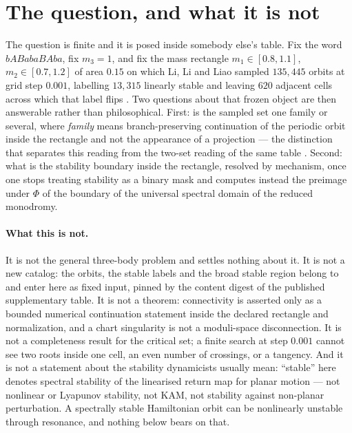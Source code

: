 \documentclass[11pt]{article}
\begin{document}
\section{The question, and what it is not}

The question is finite and it is posed inside somebody else's table. Fix the word $bABabaBAba$, fix
$m_3=1$, and fix the mass rectangle $m_1\in[0.8,1.1]$, $m_2\in[0.7,1.2]$ of area $0.15$ on which
Li, Li and Liao sampled $135{,}445$ orbits at grid step $0.001$, labelling $13{,}315$ linearly
stable and leaving $620$ adjacent cells across which that label flips \cite{li2021stable}. Two
questions about that frozen object are then answerable rather than philosophical. First: is the
sampled set one family or several, where \emph{family} means branch-preserving continuation of the
periodic orbit inside the rectangle and not the appearance of a projection --- the distinction that
separates this reading from the two-set reading of the same table \cite{stancevic2023moth}. Second:
what is the stability boundary inside the rectangle, resolved by mechanism, once one stops treating
stability as a binary mask and computes instead the preimage under $\Phi$ of the boundary of the
universal spectral domain of the reduced monodromy.

\paragraph{What this is not.} It is not the general three-body problem and settles nothing about it.
It is not a new catalog: the orbits, the stable labels and the broad stable region belong to
\cite{li2021stable} and enter here as fixed input, pinned by the content digest of the published
supplementary table. It is not a theorem: connectivity is asserted only as a bounded numerical
continuation statement inside the declared rectangle and normalization, and a chart singularity is
not a moduli-space disconnection. It is not a completeness result for the critical set; a finite
search at step $0.001$ cannot see two roots inside one cell, an even number of crossings, or a
tangency. And it is not a statement about the stability dynamicists usually mean: ``stable'' here
denotes spectral stability of the linearised return map for planar motion --- not nonlinear or
Lyapunov stability, not KAM, not stability against non-planar perturbation. A spectrally stable
Hamiltonian orbit can be nonlinearly unstable through resonance, and nothing below bears on that.
\end{document}

